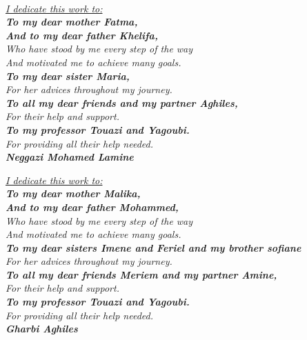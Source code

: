 \vspace*{0.1in}

\thispagestyle{empty}

\let\clearpage\relax
{}

\begin{center}
    \textit{\fontsize{34}{46}{\bfseries{\color{Black}{Dedication}}}}
    \\
    \vspace{0.2in}
    \itshape
    \Large{\underline{I dedicate this work to:}}\\          \textbf{\large{To my dear mother Fatma,}}\\\vspace{-0.1in}
    \textbf{\large{And to my dear father Khelifa,}}\\
    \large{Who have stood by me every step of the way\\\vspace{-0.1in}And motivated me to achieve many goals.}\\
    \textbf{\large{To my dear sister Maria,}}\\
    \large{For her advices throughout my journey.}\\
    \textbf{\large{To all my dear friends and my partner Aghiles,}}\\
    \large{For their help and support.}\\
    \textbf{\large{To my professor Touazi and Yagoubi.}}\\
    \large{For providing all their help needed.}\\
    \hfill\textbf{\Large{Neggazi Mohamed Lamine}}

    \vspace{0.18in}
    \itshape
    \Large{\underline{I dedicate this work to:}}\\          \textbf{\large{To my dear mother Malika,}}\\\vspace{-0.1in}
    \textbf{\large{And to my dear father Mohammed,}}\\
    \large{Who have stood by me every step of the way\\\vspace{-0.1in}And motivated me to achieve many goals.}\\
    \textbf{\large{To my dear sisters Imene and Feriel and my brother sofiane}}\\
    \large{For her advices throughout my journey.}\\
    \textbf{\large{To all my dear friends Meriem and my partner Amine,}}\\
    \large{For their help and support.}\\
    \textbf{\large{To my professor Touazi and Yagoubi.}}\\
    \large{For providing all their help needed.}\\
    \hfill\textbf{\Large{Gharbi Aghiles}}

\end{center}



